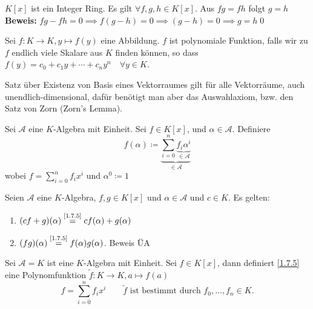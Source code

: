 \begin{subcorollary}
	$ K[x] $ ist ein Integer Ring.
	Es gilt $ \forall f, g, h \in K[x] $.
	Aus $ fg = fh $ folgt $ g = h $\\
	\textbf{Beweis:} $ fg - fh = 0 \implies f(g - h) = 0 \implies (g - h) = 0 \implies g = h $\qed
\end{subcorollary}

\begin{subdefinition}
	Sei $ f : K \to K, y \mapsto f(y) $ eine Abbildung.
	$ f $ ist polynomiale Funktion, falls wir zu $ f $ endlich viele Skalare aus $ K $ finden können, so dass $ f(y) = c_0 + c_1y + \dotsb + c_n y^n \quad \forall y \in K $.
\end{subdefinition}

Satz über Existenz von Basis eines Vektorraumes gilt für alle Vektorräume, auch unendlich-di\-mensional, dafür benötigt man aber das Auswahlaxiom, bzw. den Satz von Zorn (Zorn's Lemma).

\begin{subdefinition}
	Sei $ \mathcal{A}  $ eine $ K $-Algebra mit Einheit.
	Sei $ f \in K[x] $, und $ \alpha \in \mathcal{A}  $.
	Definiere
	\[
		f(\alpha) \coloneqq \underbrace{\sum_{i=0}^{n} \underbrace{ f_i \alpha^i}_{\in \mathcal{A} }}_{\in \mathcal{A} }
	\]
	wobei $ f = \sum_{i=0}^{n} f_i x^i $ und $ \alpha^0 \coloneqq 1 $
\end{subdefinition}

\begin{subtheorem}
	Seien $ \mathcal{A}  $ eine $ K $-Algebra, $ f, g \in K[x] $ und $ \alpha \in \mathcal{A}  $ und $ c \in K $.
	Es gelten:
	\begin{enumerate}[label=(\roman*)]
		\item $ (cf + g)(\alpha) \overset{\text{\ref{1.7.5}} }{=} cf(\alpha) + g(\alpha) $
		\item $ (f g)(\alpha) \overset{\text{\ref{1.7.5}} }{=} f(\alpha) g(\alpha) $. Beweis ÜA
	\end{enumerate}
\end{subtheorem}

\begin{subexample}
	Sei $ \mathcal{A} = K $ ist eine $ K $-Algebra mit Einheit. 
	Sei $ f \in K[x] $, dann definiert \ref{1.7.5} eine Polynomfunktion $ \tilde{f} : K \to K, a \mapsto f(a) $ 
	\[
		f = \sum_{i=0}^{n} f_i x^i \qquad \tilde{f} \text{ ist bestimmt durch } f_0, \dotsc, f_n \in K.
	\]
\end{subexample}

